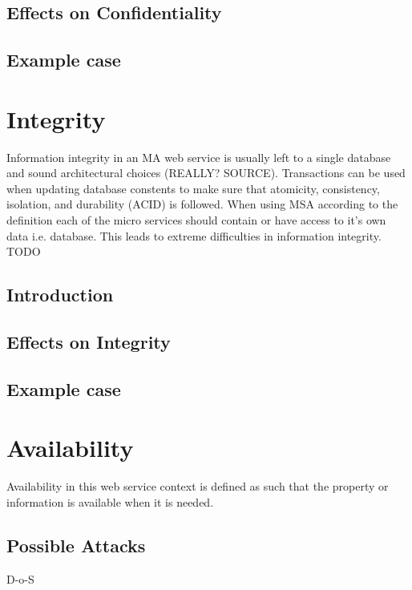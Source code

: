 \subsection{Effects on Confidentiality}


\subsection{Example case}

\section{Integrity}
\begin{sloppypar}
    Information integrity in an MA web service is usually left to a single database 
    and sound architectural choices (REALLY? SOURCE).
    Transactions can be used when updating database constents to make sure that
    atomicity, consistency, isolation, and durability (ACID) \citep{acid} is followed.
    When using MSA according to the definition each of the micro services should contain 
    or have access to it's own data i.e. database. This leads to extreme difficulties in information integrity.
    TODO
\end{sloppypar}


\subsection{Introduction}
\subsection{Effects on Integrity}
\subsection{Example case}



\section{Availability}
\begin{sloppypar}
    Availability in this web service context is defined as such that the property or information 
    is available when it is needed.

    
    
\end{sloppypar}

\subsection{Possible Attacks}
\begin{sloppypar}
    D-o-S 
\end{sloppypar}



